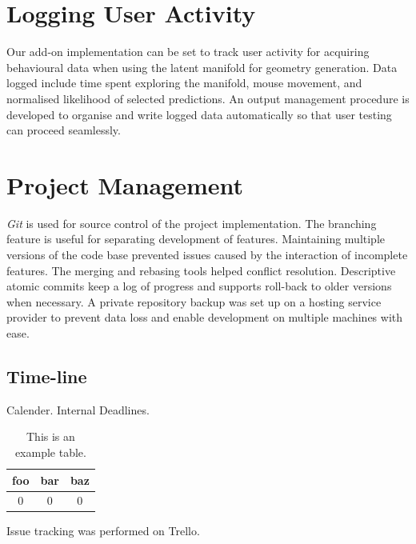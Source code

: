\documentclass[ %
author={Dillon Keith Diep},
supervisor={Dr. Carl Henrik Ek},
degree={MEng},
title={ART-CG:},
subtitle={Assisted Real-time Content Generation of 3D Hair by Learning Manifolds},
type={Research},
year={2017} ]{dissertation}
\begin{document}
\section{Logging User Activity}
Our add-on implementation can be set to track user activity for acquiring behavioural data when using the latent manifold for geometry generation. Data logged include time spent exploring the manifold, mouse movement, and normalised likelihood of selected predictions. An output management procedure is developed to organise and write logged data automatically so that user testing can proceed seamlessly.

\section{Project Management}
\textit{Git} is used for source control of the project implementation. The branching feature is useful for separating development of features. Maintaining multiple versions of the code base prevented issues caused by the interaction of incomplete features. The merging and rebasing tools helped conflict resolution. Descriptive atomic commits keep a log of progress and supports roll-back to older versions when necessary. A private repository backup was set up on a hosting service provider to prevent data loss and enable development on multiple machines with ease.


\subsection{Time-line}
Calender.
Internal Deadlines.

\begin{table}[!h]
	\centering
	\begin{tabular}{|cc|c|}
		\hline
		foo      & bar      & baz      \\
		\hline
		$0     $ & $0     $ & $0     $ \\
		\hline
	\end{tabular}
	\caption{This is an example table.}
	\label{tab}
\end{table}

Issue tracking was performed on Trello.

\end{document}
